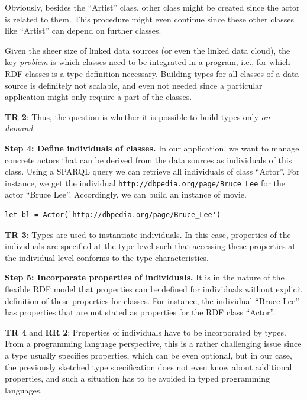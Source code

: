 \documentclass{llncs} %
\newcommand{\rr}[1]{\textbf{RR #1}}
\newcommand{\tr}[1]{\textbf{TR #1}}
\begin{document}
Obviously, besides the ``Artist'' class, other class might be created since the actor is related to them. This procedure might even continue since
these other classes like ``Artist'' can depend on further classes.

Given the sheer size of linked data sources (or even the linked data cloud), the key \emph{problem} is which classes need to be 
integrated in a program, i.e., for which RDF classes is a type definition necessary. Building types for all classes of a
data source is definitely not scalable, and even not needed since a particular application 
might only require a part of the classes.

\tr{2}: Thus, the question is whether it is possible to build types only \emph{on demand}.

\vspace{0.6em}
\noindent
\textbf{Step 4: Define individuals of classes.}
In our application, we want to manage concrete actors that can be derived from the data sources
as individuals of this class. Using a SPARQL query we can retrieve all individuals of class ``Actor''.
For instance, we get the individual \texttt{http://dbpedia.org/page/Bruce\_Lee} for the actor ``Bruce Lee''.
Accordingly, we can build an instance of movie.

\begin{lstlisting}[style=code, caption={Individual of  ``Actor'' }, label={lst:skyfall}]
let bl = Actor(`http://dbpedia.org/page/Bruce_Lee')
\end{lstlisting}

\tr{3}: Types are used to instantiate individuals. In this case, properties of the individuals are specified at the type level
          such that accessing these properties at the individual level conforms to the type characteristics.

\vspace{0.8em}
\noindent
\textbf{Step 5: Incorporate properties of individuals.}
It is in the nature of the flexible RDF model that properties can be defined for individuals 
without explicit definition of these properties for classes. For instance, the individual
``Bruce Lee'' has properties that are not stated as properties for the RDF class ``Actor''.

\tr{4} and \rr{2}: Properties of individuals have to be incorporated by types. From a programming language perspective,
this is a rather challenging issue since a type usually specifies properties, which can be even optional,
but in our case, the previously sketched type specification does not even know about additional properties,
and such a situation has to be avoided in typed programming languages.
\end{document}
